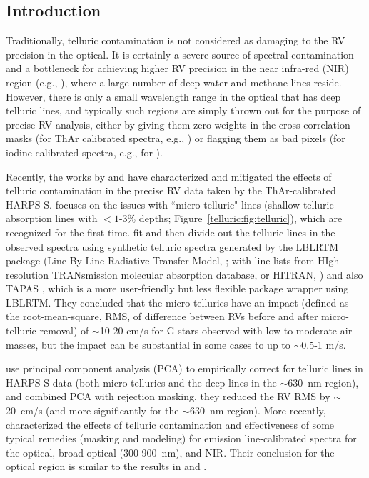 \subsection{Introduction}\label{keck:telluric:intro}

Traditionally, telluric contamination is not considered as damaging to
the RV precision in the optical. It is certainly a severe source of
spectral contamination and a bottleneck for achieving higher RV
precision in the near infra-red (NIR) region (e.g.,
\citealt{2010ApJ...713..410B}), where a large number of deep water and
methane lines reside. However, there is only a small wavelength
range in the optical that has deep telluric lines, and typically such
regions are simply thrown out for the purpose of precise RV analysis,
either by giving them zero weights in the cross correlation masks (for
ThAr calibrated spectra, e.g., \citealt{2002A&A...388..632P}) or
flagging them as bad pixels (for iodine calibrated spectra, e.g., for
\keck).

Recently, the works by \cite{artigau2014} and \cite{cunha2014} have
characterized and mitigated the effects of telluric contamination in
the precise RV data taken by the ThAr-calibrated HARPS-S.
\cite{cunha2014} focuses on the issues with ``micro-telluric" lines
(shallow telluric absorption lines with $<1$-3\% depths;
Figure~\ref{telluric:fig:telluric}), which are recognized for the
first time. \cite{cunha2014} fit and then divide out the telluric
lines in the observed spectra using synthetic telluric spectra
generated by the LBLRTM package (Line-By-Line Radiative Transfer
Model, \citealt{lblrtm}; with line lists from HIgh-resolution
TRANsmission molecular absorption database, or HITRAN,
\citealt{hitran2013}) and also TAPAS \citep{tapas}, which is a more
user-friendly but less flexible package wrapper using LBLRTM. They
concluded that the micro-tellurics have an impact (defined as the
root-mean-square, RMS, of difference between RVs before and after
micro-telluric removal) of $\sim$10-20 cm/s for G stars observed with
low to moderate air masses, but the impact can be substantial in some
cases to up to $\sim$0.5-1 m/s.

\cite{artigau2014} use principal component analysis (PCA) to
empirically correct for telluric lines in HARPS-S data (both
micro-tellurics and the deep lines in the $\sim$630~nm region), and
combined PCA with rejection masking, they reduced the RV RMS by
$\sim$20~cm/s (and more significantly for the $\sim$630~nm
region). More recently, \cite{2016AAS...22713719S} characterized the
effects of telluric contamination and effectiveness of some typical
remedies (masking and modeling) for emission line-calibrated spectra
for the optical, broad optical (300-900~nm), and NIR. Their conclusion
for the optical region is similar to the results in \cite{artigau2014}
and \cite{cunha2014}.


